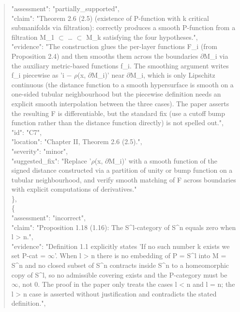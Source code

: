\documentclass[11pt]{article}
\begin{document}
\begin{quote}
      "assessment": "partially\_supported",\\
      "claim": "Theorem 2.6 (2.5) (existence of P-function with k critical submanifolds via filtration): correctly produces a smooth P-function from a filtration M\_1 \ensuremath{\subset} … \ensuremath{\subset} M\_k satisfying the four hypotheses.",\\
      "evidence": "The construction glues the per-layer functions F\_i (from Proposition 2.4) and then smooths them across the boundaries \ensuremath{\partial}M\_i via the auxiliary metric-based functions f\_i. The smoothing argument writes f\_i piecewise as 'i \ensuremath{-} \ensuremath{\rho}(x, \ensuremath{\partial}M\_i)' near \ensuremath{\partial}M\_i, which is only Lipschitz continuous (the distance function to a smooth hypersurface is smooth on a one-sided tubular neighbourhood but the piecewise definition needs an explicit smooth interpolation between the three cases). The paper asserts the resulting F is differentiable, but the standard fix (use a cutoff bump function rather than the distance function directly) is not spelled out.",\\
      "id": "C7",\\
      "location": "Chapter II, Theorem 2.6 (2.5).",\\
      "severity": "minor",\\
      "suggested\_fix": "Replace '\ensuremath{\rho}(x, \ensuremath{\partial}M\_i)' with a smooth function of the signed distance constructed via a partition of unity or bump function on a tubular neighbourhood, and verify smooth matching of F across boundaries with explicit computations of derivatives."\\
    \},\\
    \{\\
      "assessment": "incorrect",\\
      "claim": "Proposition 1.18 (1.16): The S\^{}l-category of S\^{}n equals zero when l > n.",\\
      "evidence": "Definition 1.1 explicitly states 'If no such number k exists we set P-cat = \ensuremath{\infty}'. When l > n there is no embedding of P = S\^{}l into M = S\^{}n and no closed subset of S\^{}n contracts inside S\^{}n to a homeomorphic copy of S\^{}l, so no admissible covering exists and the P-category must be \ensuremath{\infty}, not 0. The proof in the paper only treats the cases l < n and l = n; the l > n case is asserted without justification and contradicts the stated definition.",\\

\end{quote}
\end{document}
